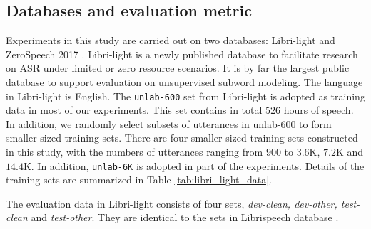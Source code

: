 \documentclass[a4paper]{article}
\begin{document}
\subsection{Databases and evaluation metric}
Experiments in this study are carried out on two databases: Libri-light \cite{kahn2019librilight} and ZeroSpeech 2017 \cite{dunbar2017zero}. Libri-light is a newly published   database to facilitate research on ASR under limited or zero resource scenarios. It is by far the largest public database to support evaluation on unsupervised subword modeling. The language in Libri-light is English. The \texttt{unlab-600} set from Libri-light is adopted as training data in most of our experiments. This set contains 
in total $526$ hours of speech. In addition, we randomly select subsets of utterances in unlab-600   to form smaller-sized training sets. There are four smaller-sized training sets constructed in this study, with the numbers of utterances ranging from $900$ to $3.6$K, $7.2$K and $14.4$K. In addition, \texttt{unlab-6K} is adopted in part of the experiments. Details of the training sets are summarized in Table \ref{tab:libri_light_data}.
\begin{table}[!tbp]
\renewcommand\arraystretch{1}
\centering
\caption{Libri-light training data and its subsets.}
\label{tab:libri_light_data}
\end{table}
The evaluation data in Libri-light consists of four sets, \textit{dev-clean, dev-other, test-clean} and \textit{test-other}. 
They are identical to the sets in Librispeech database \cite{panayotov2015librispeech}. 
\end{document}
